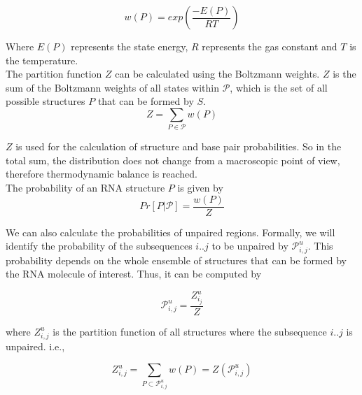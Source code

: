 \documentclass[twoside,a4paper]{report}
\numberwithin{equation}{section}
\begin{document}
% 	
% 	  
 	
 	\begin{equation}
 	\label{eq:equ3}
w(P)= exp\left( \frac{-E(P)}{RT} \right)
 	\end{equation}
 	 
 	 Where $E(P)$ represents the state energy, $R $ represents the gas constant and $T$ is the temperature.\\
 	 The partition function $Z$ can be calculated using the Boltzmann weights. $Z$ is the sum of the Boltzmann weights of all states within $\mathcal{P}$, which is the set of all possible structures $P$ that can be formed by $S$. \\
 	 \begin{equation}
 	 \label{eq:equ4}
 	 	Z= \sum_{P \in \mathcal{P}} w(P)
 		\end{equation}
 	 
 	 $Z$ is used for the calculation of structure and base pair probabilities. So in the total sum, the distribution does not change from a macroscopic point of view, therefore thermodynamic balance is reached.\\
 	 The probability of an RNA structure $P$ is given by \\ 
 	   \begin{equation}
 	  \label{eq:equ5}	 
 	 Pr[P|\mathcal{P}] = \frac{w(P)}{Z} 
 	\end{equation}

  	
  	 We can also calculate the probabilities of unpaired regions. Formally, we will identify the probability of the subsequences $i..j$ to be unpaired by $\mathcal{P}_{i,j}^{u}$. This probability depends on the whole ensemble of structures that can be formed by the RNA molecule of interest. Thus, it can be computed by\\
     \begin{center}	 
     	\[ 
     	\mathcal{P}_{i,j}^{u} = \frac{Z^u_{i_j}}{Z}
     	\]
     \end{center}
 	 where $Z^u_{i,j}$ is the partition function of all structures where the subsequence $i..j$ is unpaired. i.e.,\\
 	 
 	  
 	 \begin{center}	 
 	 	\[ 
 	 	Z^u_{i,j}= \sum_{P \subset \mathcal{P}_{i,j}^{u}} w(P) = Z(\mathcal{P}_{i,j}^{u})
 	 	\]
 	 \end{center}
  
\end{document}
